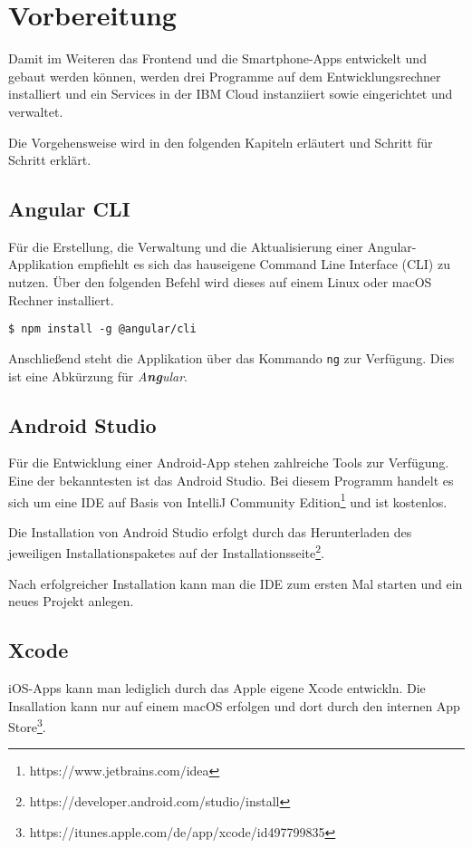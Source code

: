 \section{Vorbereitung}
Damit im Weiteren das Frontend und die Smartphone-Apps entwickelt und gebaut werden können, werden drei Programme auf
dem Entwicklungsrechner installiert und ein Services in der IBM Cloud instanziiert sowie eingerichtet und verwaltet.

Die Vorgehensweise wird in den folgenden Kapiteln erläutert und Schritt für Schritt erklärt.

\subsection{Angular CLI}
Für die Erstellung, die Verwaltung und die Aktualisierung einer Angular-Applikation empfiehlt es sich das hauseigene
Command Line Interface (CLI) zu nutzen. Über den folgenden Befehl wird dieses auf einem Linux oder macOS Rechner
installiert.

\begin{lstlisting}[caption=Installation des Angular CLI, label=ls:vorbereitung_angularcli]
    $ npm install -g @angular/cli
\end{lstlisting}

Anschließend steht die Applikation über das Kommando \texttt{ng} zur Verfügung. Dies ist eine Abkürzung für
\textit{A\textbf{ng}ular}.

\subsection{Android Studio}
Für die Entwicklung einer Android-App stehen zahlreiche Tools zur Verfügung. Eine der bekanntesten ist das Android
Studio. Bei diesem Programm handelt es sich um eine IDE auf Basis von IntelliJ Community
Edition\footnote{https://www.jetbrains.com/idea} und ist kostenlos.

Die Installation von Android Studio erfolgt durch das Herunterladen des jeweiligen Installationspaketes auf der
Installationsseite\footnote{https://developer.android.com/studio/install}.

Nach erfolgreicher Installation kann man die IDE zum ersten Mal starten und ein neues Projekt anlegen.

\subsection{Xcode}
iOS-Apps kann man lediglich durch das Apple eigene Xcode entwickln. Die Insallation kann nur auf einem macOS
erfolgen und dort durch den internen App Store\footnote{https://itunes.apple.com/de/app/xcode/id497799835}.

